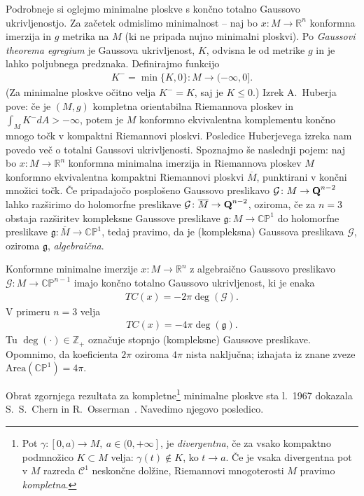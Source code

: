 \documentclass[12pt,a4paper,twoside]{article}
\theoremstyle{definition} %
\theoremstyle{plain} %
\numberwithin{equation}{section}  %
\newcommand{\R}{\mathbb R}
\newcommand{\Z}{\mathbb Z}
\begin{document}
Podrobneje si oglejmo minimalne ploskve s končno totalno Gaussovo ukrivljenostjo. Za začetek odmislimo minimalnost -- naj bo $x \colon M \to \R^{n}$ konformna imerzija in $g$ metrika na $M$ (ki ne pripada nujno minimalni ploskvi). Po \emph{Gaussovi theorema egregium} je Gaussova ukrivljenost, $K$, odvisna le od metrike $g$ in je lahko poljubnega predznaka. Definirajmo funkcijo
\begin{gather*}
K^{-} = \min \{K,0 \} \colon M \to (-\infty, 0].
\end{gather*}
(Za minimalne ploskve očitno velja $K^{-} = K$, saj je $K \leq 0$.)
%
Izrek A.~Huberja~\cite[Theorem~2.6.4]{alarcon2021minimal} pove: če je $(M,g)$ kompletna orientabilna Riemannova ploskev in $\int_{M} K^{-}dA > -\infty$, potem je $M$ konformno ekvivalentna komplementu končno mnogo točk v kompaktni Riemannovi ploskvi. \newline
Posledice Huberjevega izreka nam povedo več o totalni Gaussovi ukrivljenosti.
Spoznajmo še naslednji pojem: naj bo $x \colon M \to \R^{n}$ konformna minimalna imerzija in Riemannova ploskev $M$ konformno ekvivalentna kompaktni Riemannovi ploskvi $\overline{M}$, punktirani v končni množici točk. 
Če pripadajočo posplošeno Gaussovo preslikavo $\mathcal{G} \colon M \to \textup{\textbf{Q}}^{n-2}$ lahko razširimo do holomorfne preslikave $\mathcal{G} \colon \overline{M} \to \textup{\textbf{Q}}^{n-2}$, oziroma, če za $n=3$ obstaja razširitev kompleksne Gaussove preslikave $\mathfrak{g} \colon M \to \mathbb{CP}^1$ do holomorfne preslikave $\mathfrak{g} \colon \overline{M} \to \mathbb{CP}^1$, tedaj pravimo, da je (kompleksna) Gaussova preslikava $\mathcal{G}$, oziroma $\mathfrak{g}$, \emph{algebraična}.

Konformne minimalne imerzije $x \colon M \to \R^{n}$ z algebraično Gaussovo preslikavo $\mathcal{G} \colon M \to \mathbb{CP}^{n-1}$ imajo končno totalno Gaussovo ukrivljenost, ki je enaka
\begin{gather}
TC(x) = -2\pi \deg(\mathcal{G}).
\end{gather}
V primeru $n=3$ velja
\begin{gather}
TC(x) = -4\pi \deg(\mathfrak{g}).
\end{gather}
Tu $\deg(\cdot) \in \Z_{+}$ označuje stopnjo (kompleksne) Gaussove preslikave. Opomnimo, da koeficienta $2\pi$ oziroma $4\pi$ nista naključna; izhajata iz znane zveze $\text{Area}(\mathbb{CP}^1) = 4\pi$.

Obrat zgornjega rezultata za kompletne\footnote{Pot $\gamma \colon [0,a) \to M, \ a \in (0,+\infty]$, je \emph{divergentna}, če za vsako kompaktno podmnožico $K \subset M$ velja: $\gamma(t) \notin K$, ko $t \to a$. Če je vsaka divergentna pot v $M$ razreda $\mathcal{C}^{1}$ neskončne dolžine, Riemannovi mnogoterosti $M$ pravimo \emph{kompletna}.} 
minimalne ploskve sta l.~1967 dokazala S.~S.~Chern in R.~Osserman~\cite[Theorem~2.6.7]{alarcon2021minimal}.
Navedimo njegovo posledico.
\end{document}
